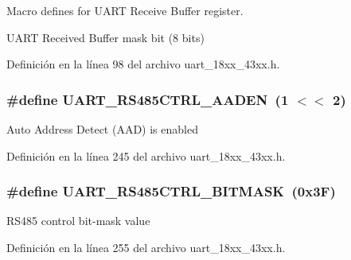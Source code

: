 Macro defines for U\+A\+RT Receive Buffer register. 

U\+A\+RT Received Buffer mask bit (8 bits) 

Definición en la línea 98 del archivo uart\+\_\+18xx\+\_\+43xx.\+h.

\subsubsection[{\texorpdfstring{U\+A\+R\+T\+\_\+\+R\+S485\+C\+T\+R\+L\+\_\+\+A\+A\+D\+EN}{UART_RS485CTRL_AADEN}}]{\setlength{\rightskip}{0pt plus 5cm}\#define U\+A\+R\+T\+\_\+\+R\+S485\+C\+T\+R\+L\+\_\+\+A\+A\+D\+EN~(1 $<$$<$ 2)}\hypertarget{group___u_a_r_t__18_x_x__43_x_x_ga1e4adf900200efcdfaab657b180b30d1}{}\label{group___u_a_r_t__18_x_x__43_x_x_ga1e4adf900200efcdfaab657b180b30d1}
Auto Address Detect (A\+AD) is enabled 

Definición en la línea 245 del archivo uart\+\_\+18xx\+\_\+43xx.\+h.

\subsubsection[{\texorpdfstring{U\+A\+R\+T\+\_\+\+R\+S485\+C\+T\+R\+L\+\_\+\+B\+I\+T\+M\+A\+SK}{UART_RS485CTRL_BITMASK}}]{\setlength{\rightskip}{0pt plus 5cm}\#define U\+A\+R\+T\+\_\+\+R\+S485\+C\+T\+R\+L\+\_\+\+B\+I\+T\+M\+A\+SK~(0x3\+F)}\hypertarget{group___u_a_r_t__18_x_x__43_x_x_ga4ab3c90d083989134e4881e0b82e7364}{}\label{group___u_a_r_t__18_x_x__43_x_x_ga4ab3c90d083989134e4881e0b82e7364}
R\+S485 control bit-\/mask value 

Definición en la línea 255 del archivo uart\+\_\+18xx\+\_\+43xx.\+h.

